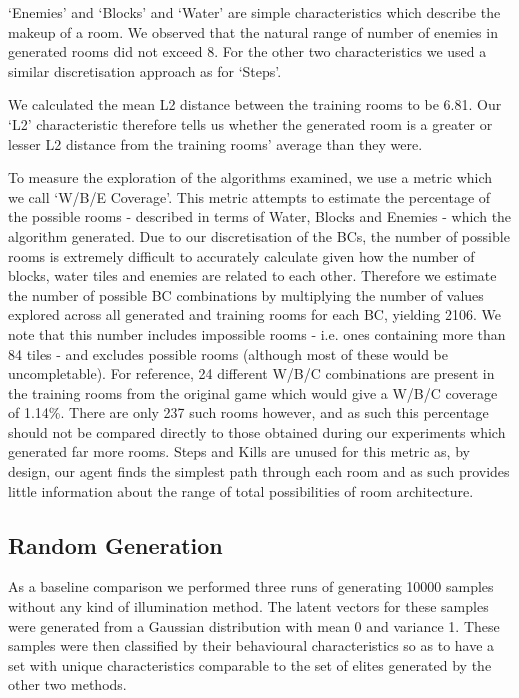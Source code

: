 \documentclass{article}
\begin{document}
`Enemies' and `Blocks' and `Water' are simple characteristics which describe the makeup of a room. We observed that the natural range of number of enemies in generated rooms did not exceed 8. For the other two characteristics we used a similar discretisation approach as for `Steps'.

We calculated the mean L2 distance between the training rooms to be 6.81. Our `L2' characteristic therefore tells us whether the generated room is a greater or lesser L2 distance from the training rooms' average than they were.

To measure the exploration of the algorithms examined, we use a metric which we call `W/B/E Coverage'. This metric attempts to estimate the percentage of the possible rooms - described in terms of Water, Blocks and Enemies - which the algorithm generated. Due to our discretisation of the BCs, the number of possible rooms is extremely difficult to accurately calculate given how the number of blocks, water tiles and enemies are related to each other. Therefore we estimate the number of possible BC combinations by multiplying the number of values explored across all generated and training rooms for each BC, yielding 2106. We note that this number includes impossible rooms - i.e. ones containing more than 84 tiles - and excludes possible rooms (although most of these would be uncompletable). For reference, 24 different W/B/C combinations are present in the training rooms from the original game which would give a W/B/C coverage of 1.14\%. There are only 237 such rooms however, and as such this percentage should not be compared directly to those obtained during our experiments which generated far more rooms. Steps and Kills are unused for this metric as, by design, our agent finds the simplest path through each room and as such provides little information about the range of total possibilities of room architecture.

\subsection{Random Generation}

As a baseline comparison we performed three runs of generating 10000 samples without any kind of illumination method. The latent vectors for these samples were generated from a Gaussian distribution with mean 0 and variance 1. These samples were then classified by their behavioural characteristics so as to have a set with unique characteristics comparable to the set of elites generated by the other two methods.
\end{document}
